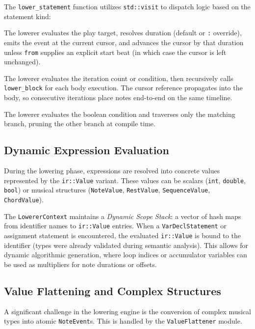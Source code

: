 The \texttt{lower\_statement} function utilizes \texttt{std::visit} to dispatch logic based on the statement kind:

 The lowerer evaluates the play target, resolves duration (default or \texttt{:}
override), emits the event at the current cursor, and advances the cursor by that duration unless \texttt{from}
supplies an explicit start beat (in which case the cursor is left unchanged).

 The lowerer evaluates the iteration count or condition,
then recursively calls \texttt{lower\_block} for each body execution.
The cursor reference propagates into the body, so consecutive iterations place notes end-to-end on the same timeline.

 The lowerer evaluates the boolean condition and traverses only the matching branch,
pruning the other branch at compile time.

\subsection{Dynamic Expression Evaluation}\label{detail-subsec:dynamic-expression-evaluation}

During the lowering phase, expressions are resolved into concrete values represented by the \texttt{ir::Value} variant.
These values can be scalars (\texttt{int}, \texttt{double}, \texttt{bool}) or musical structures (\texttt{NoteValue},
\texttt{RestValue}, \texttt{SequenceValue}, \texttt{ChordValue}).

The \texttt{LowererContext} maintains a \textit{Dynamic Scope Stack}: a vector of hash maps from identifier names to
\texttt{ir::Value} entries.
When a \texttt{VarDeclStatement} or assignment statement is encountered, the evaluated \texttt{ir::Value} is bound to
the identifier (types were already validated during semantic analysis).
This allows for dynamic algorithmic generation, where loop indices or accumulator variables can be used as multipliers
for note durations or offsets.

\subsection{Value Flattening and Complex Structures}\label{detail-subsec:value-flattening-and-complex-structures}

A significant challenge in the lowering engine is the conversion of complex musical types into atomic
\texttt{NoteEvent}s.
This is handled by the \texttt{ValueFlattener} module.

